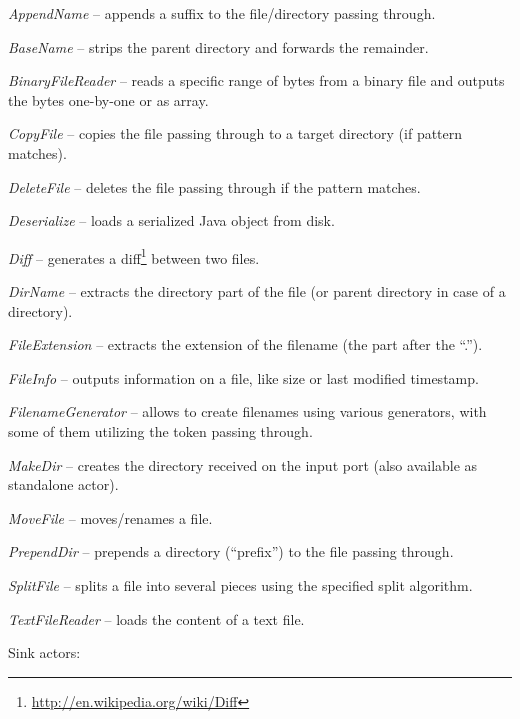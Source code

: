 \begin{tight_itemize}
	\item \textit{AppendName} -- appends a suffix to the file/directory passing
	through.
	\item \textit{BaseName} -- strips the parent directory and forwards the
	remainder.
	\item \textit{BinaryFileReader} -- reads a specific range of bytes from 
	a binary file and outputs the bytes one-by-one or as array.
	\item \textit{CopyFile} -- copies the file passing through to a target
	directory (if pattern matches).
	\item \textit{DeleteFile} -- deletes the file passing through if the pattern
	matches.
	\item \textit{Deserialize} -- loads a serialized Java object from disk.
	\item \textit{Diff} -- generates a diff\footnote{\url{http://en.wikipedia.org/wiki/Diff}{}} 
	between two files.
	\item \textit{DirName} -- extracts the directory part of the file (or parent
	directory in case of a directory).
	\item \textit{FileExtension} -- extracts the extension of the filename (the
	part after the ``.'').
	\item \textit{FileInfo} -- outputs information on a file, like size or last
	modified timestamp.
	\item \textit{FilenameGenerator} -- allows to create filenames using various
	generators, with some of them utilizing the token passing through.
	\item \textit{MakeDir} -- creates the directory received on the input port
	(also available as standalone actor).
	\item \textit{MoveFile} -- moves/renames a file.
	\item \textit{PrependDir} -- prepends a directory (``prefix'') to the file
	passing through.
	\item \textit{SplitFile} -- splits a file into several pieces using the 
	specified split algorithm.
	\item \textit{TextFileReader} -- loads the content of a text file.
\end{tight_itemize}
Sink actors:
